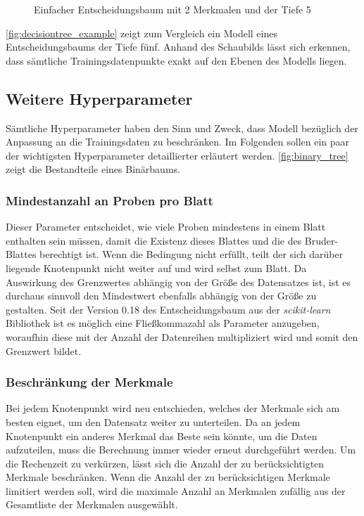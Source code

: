 \documentclass[12pt, a4paper]{article}
\begin{document}
\begin{figure}[H]
\centering
\def\svgwidth{350pt}

\caption{Einfacher Entscheidungsbaum mit 2 Merkmalen und der Tiefe 5}
\label{fig:decisiontree_example}
\end {figure}

\autoref{fig:decisiontree_example} zeigt zum Vergleich ein Modell eines Entscheidungsbaums der Tiefe fünf. Anhand des Schaubilds lässt sich erkennen, dass sämtliche Trainingsdatenpunkte exakt auf den Ebenen des Modells liegen. 

\subsection{Weitere Hyperparameter}

Sämtliche Hyperparameter haben den Sinn und Zweck, dass Modell bezüglich der Anpassung an die Trainingsdaten zu beschränken. Im Folgenden sollen ein paar der wichtigsten Hyperparameter detaillierter erläutert werden. \autoref{fig:binary_tree} zeigt die Bestandteile eines Binärbaums.

\subsubsection{Mindestanzahl an Proben pro Blatt} 

Dieser Parameter entscheidet, wie viele Proben mindestens in einem Blatt enthalten sein müssen, damit die Existenz dieses Blattes und die des Bruder-Blattes berechtigt ist. Wenn die Bedingung nicht erfüllt, teilt der sich darüber liegende Knotenpunkt nicht weiter auf und wird selbst zum Blatt. Da Auswirkung des Grenzwertes abhängig von der Größe des Datensatzes ist, ist es durchaus sinnvoll den Mindestwert ebenfalls abhängig von der Größe zu gestalten. Seit der Version 0.18 des Entscheidungsbaum aus der \textit{scikit-learn} Bibliothek ist es möglich eine Fließkommazahl als Parameter anzugeben, woraufhin diese mit der Anzahl der Datenreihen multipliziert wird und somit den Grenzwert bildet.

\subsubsection{Beschränkung der Merkmale}

Bei jedem Knotenpunkt wird neu entschieden, welches der Merkmale sich am besten eignet, um den Datensatz weiter zu unterteilen. Da an jedem Knotenpunkt ein anderes Merkmal das Beste sein könnte, um die Daten aufzuteilen, muss die Berechnung immer wieder erneut durchgeführt werden. Um die Rechenzeit zu verkürzen, lässt sich die Anzahl der zu berücksichtigten Merkmale beschränken. Wenn die Anzahl der zu berücksichtigen Merkmale limitiert werden soll, wird die maximale Anzahl an Merkmalen zufällig aus der Gesamtliste der Merkmalen ausgewählt. 
\end{document}
